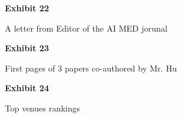 \documentclass{article}
\begin{document}
\vspace*{\fill}
\begin{center}
{\LARGE \bf
Exhibit 22
}

\vspace{10\baselineskip}

{\large A letter from Editor of the AI MED jorunal}

\end{center}
\vspace*{\fill}


% 



\vspace*{\fill}
\begin{center}
{\LARGE \bf
Exhibit 23
}

\vspace{10\baselineskip}

{\large First pages of 3 papers co-authored by Mr. Hu}

\end{center}
\vspace*{\fill}

  
  
 
 



\vspace*{\fill}
\begin{center}
{\LARGE \bf
Exhibit 24
}

\vspace{10\baselineskip}

{\large Top venues rankings}

\end{center}
\vspace*{\fill}


% 

% 

% 
\end{document}
